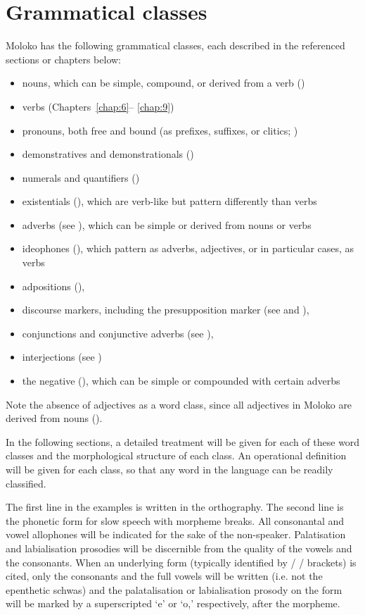 \chapter[Grammatical classes]{Grammatical classes}
\hypertarget{RefHeading1210801525720847}{}
Moloko has the following grammatical classes, each described in the referenced sections or chapters below:

\begin{itemize}
\item nouns, which can be simple, compound, or derived from a verb ()
\item verbs  (Chapters~\ref{chap:6}-- \ref{chap:9})
\item pronouns, both free and bound (as prefixes, suffixes, or clitics; )
\item demonstratives and demonstrationals ()
\item numerals and quantifiers ()
\item existentials (), which are verb-like but pattern differently than verbs
\item adverbs (see ), which can be simple or derived from nouns or verbs
\item ideophones (), which pattern as adverbs, adjectives, or in particular cases, as verbs
\item adpositions (), 
\item discourse markers, including the presupposition marker (see  and ), 
\item conjunctions and conjunctive adverbs (see ),
\item interjections (see )
\item the negative (), which can be simple or compounded with certain adverbs
\end{itemize}

Note the absence of adjectives as a word class, since all adjectives in Moloko are derived from nouns ().

In the following sections, a detailed treatment will be given for each of these word classes and the morphological structure of each class.  An operational definition will be given for each class, so that any word in the language can be readily classified.

The first line in the examples is written in the orthography. The second line is the phonetic form for slow speech with morpheme breaks. All consonantal and vowel allophones will be indicated for the sake of the non-speaker.  Palatisation and labialisation prosodies will be discernible from the quality of the vowels and the consonants. When an  underlying form (typically identified by / / brackets) is cited, only the consonants and the full vowels will be written (i.e. not the epenthetic schwas) and the palatalisation or labialisation prosody on the form will be marked by a superscripted ‘e’ or ‘o,’ respectively, after the morpheme. 

